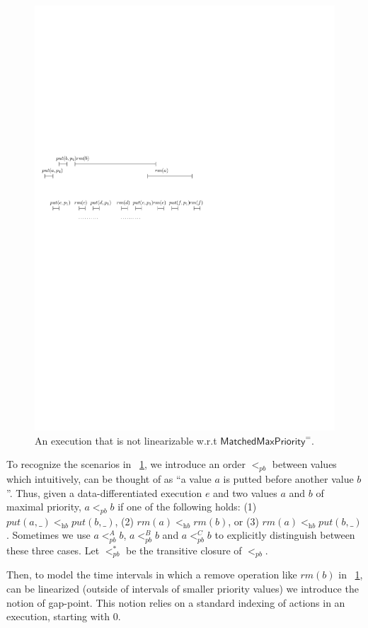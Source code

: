 \begin{figure}[htbp]
  \centering
  \includegraphics[width=0.6 \textwidth]{figures/PIC-HIS-INTRO-PB-ORDER-EPQ.pdf}
  \caption{An execution that is not linearizable w.r.t $\mathsf{MatchedMaxPriority}^=$.}
  \label{fig:introduce pb order}
\end{figure}

To recognize the scenarios in \figurename~\ref{fig:introduce pb order}, we introduce an order $<_{\textit{pb}}$ between values which intuitively, can be thought of as ``a value $a$ is putted before another value $b$''. %
Thus, given a data-differentiated execution $e$ and two values $a$ and $b$ of maximal priority, $a <_{\textit{pb}} b$ if one of the following holds: (1) $\textit{put}(a,\_) <_{\textit{hb}} \textit{put}(b,\_)$, (2) $\textit{rm}(a) <_{\textit{hb}} \textit{rm}(b)$, or (3) $\textit{rm}(a) <_{\textit{hb}} \textit{put}(b,\_)$. Sometimes we use $a <_{\textit{pb}}^A b$, $a <_{\textit{pb}}^B b$ and $a <_{\textit{pb}}^C b$ to explicitly distinguish between these three cases. Let $<_{\textit{pb}}^*$ be the transitive closure of $<_{\textit{pb}}$.

Then, to model the time intervals in which a remove operation like $\textit{rm}(b)$ in \figurename~\ref{fig:introduce pb order}, can be linearized (outside of intervals of smaller priority values) we introduce the notion of gap-point. This notion relies on a standard indexing of actions in an execution, starting with 0.

